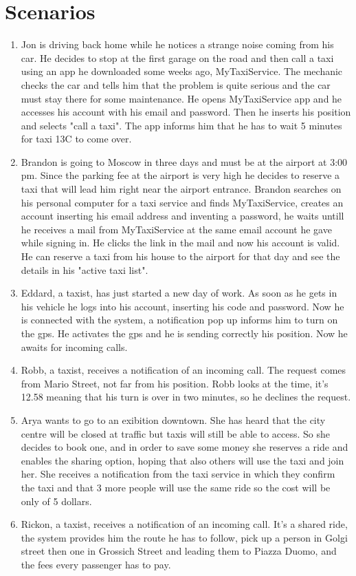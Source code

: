 \section {Scenarios}
\begin{enumerate}
\item
Jon is driving back home while he notices a strange noise coming from his car. He decides to stop at the first garage
on the road and then call a taxi using an app he downloaded some weeks ago, MyTaxiService.
The mechanic checks the car and tells him that the problem is quite serious and the car must stay there for some maintenance. 
He opens MyTaxiService app and he accesses his account with his email and password. Then he inserts his position and selects "call a taxi".
The app informs him that he has to wait 5 minutes for taxi 13C to come over.
\item
Brandon is going to Moscow in three days and must be at the airport at 3:00 pm. Since the parking fee at the airport is very high
he decides to reserve a taxi that will lead him right near the airport entrance.
Brandon searches on his personal computer for a taxi service and finds MyTaxiService, creates an account inserting his email address and 
inventing a password,
he waits untill he receives a mail from MyTaxiService at the same email account he gave while signing in. He clicks the link in the mail
and now his account is valid. He can reserve a taxi from his house to the airport for that day and see the details in his "active taxi list".
\item
Eddard, a taxist, has just started a new day of work.
As soon as he gets in his vehicle he logs into his account, inserting his code and password.
Now he is connected with the system, a notification pop up informs him to turn on the gps. He activates the gps and he is sending correctly his position. 
Now he awaits for incoming calls.
\item
Robb, a taxist, receives a notification of an incoming call. The request comes from Mario Street, not far from his position.
Robb looks at the time, it's 12.58 meaning that his turn is over in two minutes, so he declines the request.
\item
Arya wants to go to an exibition downtown.
She has heard that the city centre will be closed at traffic but taxis will still be able to access. 
So she decides to book one, and in order to save some money she reserves a ride and enables the sharing option,
hoping that also others will use the taxi and join her.
She receives a notification from the taxi service in which they confirm the taxi and that 3 more people will use the same ride so the cost will be only of 5 dollars.
\item
Rickon, a taxist, receives a notification of an incoming call. It's a shared ride, the system provides him the route he has to follow, pick up a person in Golgi street then 
one in Grossich Street and leading them to Piazza Duomo, and the fees every passenger has to pay.
\end{enumerate}

